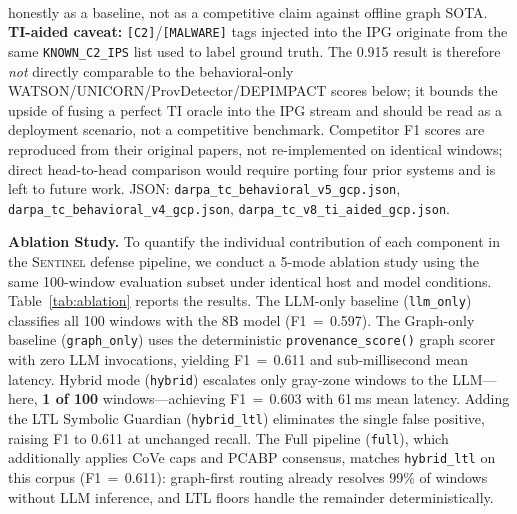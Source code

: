 \documentclass[journal]{IEEEtran}
\newcommand{\sentinel}{\textsc{Sentinel}}
\begin{document}
\begin{table}[!t]
{honestly as a baseline, not as a competitive claim against offline graph SOTA.
\textsuperscript{\textdagger}\textbf{TI-aided caveat:}
\texttt{[C2]}/\texttt{[MALWARE]} tags injected into the IPG originate from the
same \texttt{KNOWN\_C2\_IPS} list used to label ground truth. The 0.915 result
is therefore \emph{not} directly comparable to the behavioral-only
WATSON/UNICORN/ProvDetector/DEPIMPACT scores below; it bounds the upside of
fusing a perfect TI oracle into the IPG stream and should be read as a
deployment scenario, not a competitive benchmark. Competitor F1 scores are
reproduced from their original papers, not re-implemented on identical
windows; direct head-to-head comparison would require porting four prior
systems and is left to future work. JSON:
\texttt{darpa\_tc\_behavioral\_v5\_gcp.json},
\texttt{darpa\_tc\_behavioral\_v4\_gcp.json},
\texttt{darpa\_tc\_v8\_ti\_aided\_gcp.json}.}
\end{table}

\noindent\textbf{Ablation Study.}
To quantify the individual contribution of each component in the \sentinel{} defense pipeline, we conduct a 5-mode ablation study using the same 100-window evaluation subset under identical host and model conditions. Table~\ref{tab:ablation} reports the results.
The LLM-only baseline (\texttt{llm\_only}) classifies all 100 windows with the
8B model (F1\,$=$\,0.597). The Graph-only baseline (\texttt{graph\_only}) uses
the deterministic \texttt{provenance\_score()} graph scorer with zero LLM
invocations, yielding F1\,$=$\,0.611 and sub-millisecond mean latency. Hybrid
mode (\texttt{hybrid}) escalates only gray-zone windows to the LLM---here,
\textbf{1 of 100} windows---achieving F1\,$=$\,0.603 with 61\,ms mean latency.
Adding the LTL Symbolic Guardian (\texttt{hybrid\_ltl}) eliminates the single
false positive, raising F1 to 0.611 at unchanged recall. The Full pipeline
(\texttt{full}), which additionally applies CoVe caps and PCABP consensus,
matches \texttt{hybrid\_ltl} on this corpus (F1\,$=$\,0.611): graph-first
routing already resolves 99\% of windows without LLM inference, and LTL floors
handle the remainder deterministically.
\end{document}
